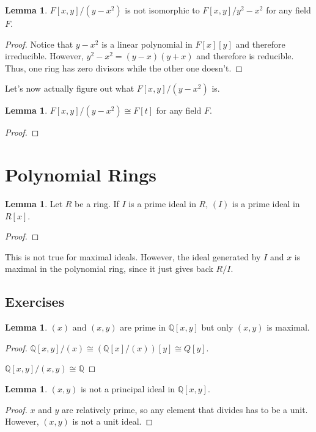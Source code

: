 \documentclass{article}
\theoremstyle{definition}
\newtheorem{lemma}[theorem]{Lemma}
\newcommand{\Q}{\mathbb{Q}}
\begin{document}
\begin{lemma}
    $F[x,y]/(y - x^{2})$ is not isomorphic to $F[x,y]/y^{2} - x^{2}$ for any field $F$.
\end{lemma}
\begin{proof}
    Notice that $y - x^{2}$ is a linear polynomial in $F[x][y]$ and therefore irreducible.
    However, $y^{2} - x^{2} = (y - x)(y + x)$ and therefore is reducible. Thus, one ring
    has zero divisors while the other one doesn't. 
\end{proof}

Let's now actually figure out what $F[x,y]/(y - x^{2})$ is.

\begin{lemma}
    $F[x,y]/(y - x^{2}) \cong F[t]$ for any field $F$.
\end{lemma}
\begin{proof}
    
\end{proof}

\newpage

\section{Polynomial Rings}

\begin{lemma}
    Let $R$ be a ring. If $I$ is a prime ideal in $R$, $(I)$ is a prime ideal in $R[x]$.
\end{lemma}
\begin{proof}
    
\end{proof}

This is not true for maximal ideals. However, the ideal generated by $I$ and $x$ is maximal in the polynomial ring, since it just gives back $R/I$.

\subsection{Exercises}

\begin{lemma}
    $(x)$ and $(x,y)$ are prime in $\mathbb{Q}[x,y]$ but only $(x,y)$ is maximal.
\end{lemma}
\begin{proof}
    $\mathbb{Q}[x,y]/ (x) \cong (\mathbb{Q}[x] /(x))[y] \cong Q[y]$.

    $\Q[x,y] / (x,y) \cong \Q$
\end{proof}

\begin{lemma}
    $(x,y)$ is not a principal ideal in $\Q[x,y]$.
\end{lemma}
\begin{proof}
    $x$ and $y$ are relatively prime, so any element that divides has to be a unit. However, $(x,y)$ is not a unit ideal.
\end{proof}
\end{document}
